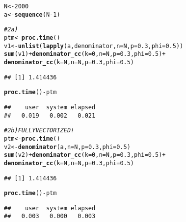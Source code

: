 \documentclass{article}\usepackage[]{graphicx}\usepackage[]{color}
\makeatletter
\newcommand{\hlnum}[1]{\textcolor[rgb]{0.686,0.059,0.569}{#1}}%
\newcommand{\hlcom}[1]{\textcolor[rgb]{0.678,0.584,0.686}{\textit{#1}}}%
\newcommand{\hlopt}[1]{\textcolor[rgb]{0,0,0}{#1}}%
\newcommand{\hlstd}[1]{\textcolor[rgb]{0.345,0.345,0.345}{#1}}%
\newcommand{\hlkwb}[1]{\textcolor[rgb]{0.69,0.353,0.396}{#1}}%
\newcommand{\hlkwc}[1]{\textcolor[rgb]{0.333,0.667,0.333}{#1}}%
\newcommand{\hlkwd}[1]{\textcolor[rgb]{0.737,0.353,0.396}{\textbf{#1}}}%
\newenvironment{kframe}{%
 \def\at@end@of@kframe{}%
 \ifinner\ifhmode%
  \def\at@end@of@kframe{\end{minipage}}%
  \begin{minipage}{\columnwidth}%
 \fi\fi%
 \def\FrameCommand##1{\hskip\@totalleftmargin \hskip-\fboxsep
 \colorbox{shadecolor}{##1}\hskip-\fboxsep
     \hskip-\linewidth \hskip-\@totalleftmargin \hskip\columnwidth}%
 \MakeFramed {\advance\hsize-\width
   \@totalleftmargin\z@ \linewidth\hsize
   \@setminipage}}%
 {\par\unskip\endMakeFramed%
 \at@end@of@kframe}
\newenvironment{knitrout}{}{} %
\makeatother
\begin{document}
\begin{knitrout}
\begin{kframe}
\begin{alltt}
\hlstd{N} \hlkwb{<-} \hlnum{2000}
\hlstd{a} \hlkwb{<-} \hlkwd{sequence}\hlstd{(N}\hlopt{-}\hlnum{1}\hlstd{)}

\hlcom{# 2a)}
\hlstd{ptm} \hlkwb{<-} \hlkwd{proc.time}\hlstd{()}
\hlstd{v1} \hlkwb{<-} \hlkwd{unlist}\hlstd{(}\hlkwd{lapply}\hlstd{(a,denominator,}\hlkwc{n}\hlstd{=N,}\hlkwc{p}\hlstd{=}\hlnum{0.3}\hlstd{,}\hlkwc{phi}\hlstd{=}\hlnum{0.5}\hlstd{))}
\hlkwd{sum}\hlstd{(v1)} \hlopt{+} \hlkwd{denominator_cc}\hlstd{(}\hlkwc{k}\hlstd{=}\hlnum{0}\hlstd{,}\hlkwc{n}\hlstd{=N,}\hlkwc{p}\hlstd{=}\hlnum{0.3}\hlstd{,}\hlkwc{phi}\hlstd{=}\hlnum{0.5}\hlstd{)} \hlopt{+}
  \hlkwd{denominator_cc}\hlstd{(}\hlkwc{k}\hlstd{=N,}\hlkwc{n}\hlstd{=N,}\hlkwc{p}\hlstd{=}\hlnum{0.3}\hlstd{,}\hlkwc{phi}\hlstd{=}\hlnum{0.5}\hlstd{)}
\end{alltt}
\begin{verbatim}
## [1] 1.414436
\end{verbatim}
\begin{alltt}
\hlkwd{proc.time}\hlstd{()} \hlopt{-} \hlstd{ptm}
\end{alltt}
\begin{verbatim}
##    user  system elapsed 
##   0.019   0.002   0.021
\end{verbatim}
\begin{alltt}
\hlcom{# 2b) FULLY VECTORIZED!}
\hlstd{ptm} \hlkwb{<-} \hlkwd{proc.time}\hlstd{()}
\hlstd{v2} \hlkwb{<-} \hlkwd{denominator}\hlstd{(a,}\hlkwc{n}\hlstd{=N,}\hlkwc{p}\hlstd{=}\hlnum{0.3}\hlstd{,}\hlkwc{phi}\hlstd{=}\hlnum{0.5}\hlstd{)}
\hlkwd{sum}\hlstd{(v2)} \hlopt{+} \hlkwd{denominator_cc}\hlstd{(}\hlkwc{k}\hlstd{=}\hlnum{0}\hlstd{,}\hlkwc{n}\hlstd{=N,}\hlkwc{p}\hlstd{=}\hlnum{0.3}\hlstd{,}\hlkwc{phi}\hlstd{=}\hlnum{0.5}\hlstd{)} \hlopt{+}
  \hlkwd{denominator_cc}\hlstd{(}\hlkwc{k}\hlstd{=N,}\hlkwc{n}\hlstd{=N,}\hlkwc{p}\hlstd{=}\hlnum{0.3}\hlstd{,}\hlkwc{phi}\hlstd{=}\hlnum{0.5}\hlstd{)}
\end{alltt}
\begin{verbatim}
## [1] 1.414436
\end{verbatim}
\begin{alltt}
\hlkwd{proc.time}\hlstd{()} \hlopt{-} \hlstd{ptm}
\end{alltt}
\begin{verbatim}
##    user  system elapsed 
##   0.003   0.000   0.003
\end{verbatim}
\end{kframe}
\end{knitrout}

\section{}
\end{document}
